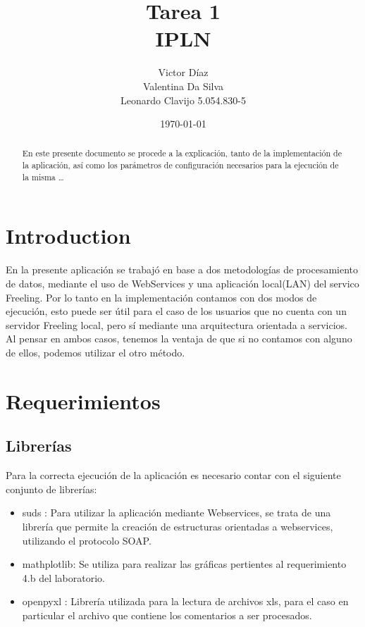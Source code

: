 \documentclass[12pt]{article}
\title{Tarea 1 \\ IPLN}
\author{
  Victor Díaz \\
  Valentina Da Silva \\
  Leonardo Clavijo 5.054.830-5
}
\date{\today}
\begin{document}
\maketitle

\begin{abstract}
En este presente documento se procede a la explicación, tanto de la implementación de la aplicación, así como los parámetros de configuración necesarios para la ejecución de la misma \ldots
\end{abstract}

\newpage

\tableofcontents

\newpage

\section{Introduction}
En la presente aplicación se trabajó en base a dos metodologías de procesamiento de datos, mediante el uso de WebServices y una aplicación local(LAN) del servico Freeling.
Por lo tanto en la implementación contamos con dos modos de ejecución, esto puede ser útil para el caso de los usuarios que no cuenta con un servidor Freeling local, pero sí mediante una arquitectura orientada a servicios.
Al pensar en ambos casos, tenemos la ventaja de que si no contamos con alguno de ellos, podemos utilizar el otro método.

\section{Requerimientos}
\subsection{Librerías}\label{lib}
Para la correcta ejecución de la aplicación es necesario contar con el siguiente conjunto de librerías:
\begin{itemize}
  \item suds :  Para utilizar la aplicación mediante Webservices, se trata de una librería que permite la creación de estructuras orientadas a webservices, utilizando el protocolo SOAP.
  \item mathplotlib: Se utiliza para realizar las gráficas pertientes al requerimiento 4.b del laboratorio.
  \item openpyxl : Librería utilizada para la lectura de archivos xls, para el caso en particular el archivo que contiene los comentarios a ser procesados.
\end{itemize}
\end{document}
